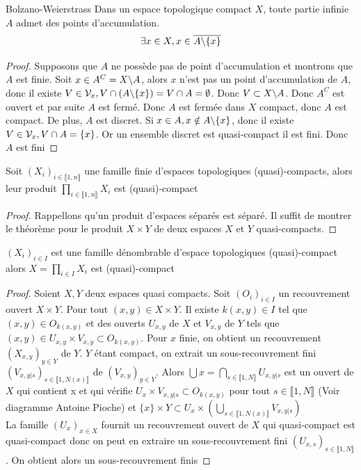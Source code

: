 \documentclass[]{report}
\begin{document}
    \begin{tm}{Bolzano-Weierstrass}{}
        Dans un espace topologique compact $X$, toute partie infinie $A$ admet des points d'accumulation.
        \[\exists x\in X,x\in \overline{A\backslash\{x\}}\]
    \end{tm}

    \begin{proof}
        Supposons que $A$ ne possède pas de point d'accumulation et montrons que $A$ est finie. Soit $x\in A^C=X\backslash A$, alors $x$ n'est pas un point d'accumulation de $A$, donc il existe $V\in\mathcal{V}_x,V\cap(A\backslash\{x\})=V\cap A=\emptyset$. Donc $V\subset X\backslash A$. Donc $A^C$ est ouvert et par suite $A$ est fermé. Donc $A$ est fermée dans $X$ compact, donc $A$ est compact. De plus, $A$ est discret. Si $x\in A,x\notin A\backslash \{x\}$, donc il existe $V\in \mathcal{V}_x,V\cap A=\{x\}$. Or un ensemble discret est quasi-compact \ssi il est fini. Donc $A$ est fini
    \end{proof}

    \begin{tm}{}{}
        Soit $(X_i)_{i\in \llbracket 1,n\rrbracket}$ une famille finie d'espaces topologiques (quasi)-compacts, alors leur produit $\displaystyle{\prod_{i\in\llbracket 1,n\rrbracket}X_i}$ est (quasi)-compact
    \end{tm}

    \begin{proof}
        Rappellons qu'un produit d'espaces séparés est séparé. Il suffit de montrer le théorème pour le produit $X\times Y$ de deux espaces $X$ et $Y$ quasi-compacts.
    \end{proof}

    \begin{tm}{}{}
        $(X_i)_{i\in I}$ est une famille dénombrable d'espace topologiques (quasi)-compact alors $X=\prod_{i\in I} X_i$ est (quasi)-compact
    \end{tm}

    \begin{proof}
        Soient $X,Y$ deux espaces quasi compacts. Soit $(O_i)_{i\in I}$ un recouvrement ouvert $X\times Y$. Pour tout $(x,y)\in X\times Y$. Il existe $k(x,y)\in I$ tel que $(x,y)\in O_{k(x,y)}$ et des ouverts $U_{x,y}$ de $X$ et $V_{x,y}$ de $Y$ tels que $(x,y)\in U_{x,y}\times V_{x,y}\subset O_{k(x,y)}$. Pour $x$ finie, on obtient un recouvrement $(X_{x,y})_{y\in Y}$ de $Y$. $Y$ étant compact, on extrait un sous-recouvrement fini $(V_{x,y|s})_{s\in\llbracket 1,N(x)\rrbracket}$ de $(V_{x,y})_{y\in Y}$. Alors $\bigcup x=\bigcap_{s\in \llbracket 1,N\rrbracket} U_{x,y|s}$ est un ouvert de $X$ qui contient x et qui vérifie $U_x\times V_{x,y|s}\subset O_{k(x,y)}$ pour tout $s\in\llbracket 1,N\rrbracket$ (Voir diagramme Antoine Pioche) et $\{x\}\times Y\subset U_x\times (\bigcup_{s\in \llbracket 1,N(x)\rrbracket} V_{x,y|s})$\\
        La famille $(U_x)_{x\in X}$ fournit un recouvrement ouvert de $X$ qui quasi-compact est quasi-compact donc on peut en extraire un sous-recouvrement fini $(U_{x,s})_{s\in \llbracket 1,N\rrbracket}$. On obtient alors un sous-recouvrement finis
    \end{proof}
\end{document}

